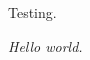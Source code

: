 \documentclass[10pt,a4paper]{report}
\begin{document}
	Testing.
	
	 \textit{Hello world.}
\end{document}

